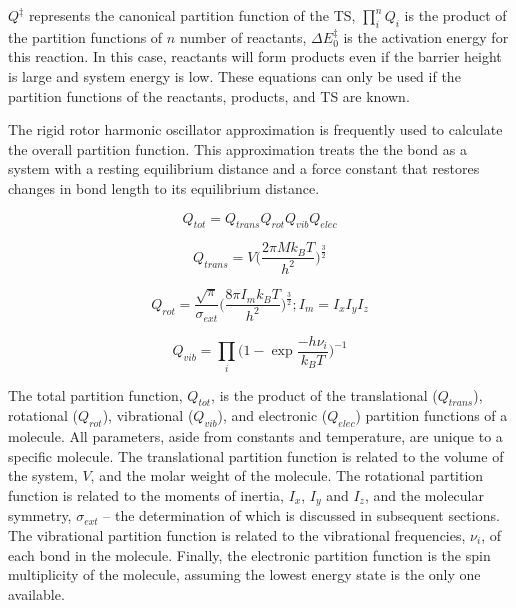 \documentclass[preprint, 11pt]{elsarticle} %
\begin{document}
$Q^\ddagger$ represents the canonical partition function of the TS, $\prod^n_i Q_i$ is the product of the partition functions of $n$ number of reactants, $\Delta E^{\ddagger}_0$ is the activation energy for this reaction.
In this case, reactants will form products even if the barrier height is large and system energy is low. 
These equations can only be used if the partition functions of the reactants, products, and TS are known. 

The rigid rotor harmonic oscillator approximation is frequently used to calculate the overall partition function.
This approximation treats the the bond as a system with a resting equilibrium distance and a force constant that restores changes in bond length to its equilibrium distance.

\begin{equation}
    Q_{tot} = Q_{trans} Q_{rot} Q_{vib} Q_{elec}
    \label{qtot}
\end{equation}

\begin{equation}
    Q_{trans} = V \bigg( \frac{2 \pi M k_B T}{h^2} \bigg)^{\frac{3}{2}}
    \label{qtrans}
\end{equation}

\begin{equation}
    Q_{rot} = \frac{\sqrt{\pi}}{\sigma_{ext}} \bigg( \frac{8 \pi I_m k_B T}{h^2} \bigg)^{\frac{3}{2}} ; I_m = I_x I_y I_z
    \label{qrot}
\end{equation}

\begin{equation}
    Q_{vib} = \prod_i \bigg(1- \exp{\frac{-h \nu_i}{k_B T}} \bigg)^{-1}
    \label{qvib}
\end{equation}

The total partition function, $Q_{tot}$, is the product of the translational ($Q_{trans}$), rotational ($Q_{rot}$), vibrational ($Q_{vib}$), and electronic ($Q_{elec}$) partition functions of a molecule. 
All parameters, aside from constants and temperature, are unique to a specific molecule.
The translational partition function is related to the volume of the system, $V$, and the molar weight of the molecule.
The rotational partition function is related to the moments of inertia, $I_x$, $I_y$ and $I_z$, and the molecular symmetry, $\sigma_{ext}$ -- the determination of which is discussed in subsequent sections.
The vibrational partition function is related to the vibrational frequencies, $\nu_i$, of each bond in the molecule.
Finally, the electronic partition function is the spin multiplicity of the molecule, assuming the lowest energy state is the only one available.
\end{document}
